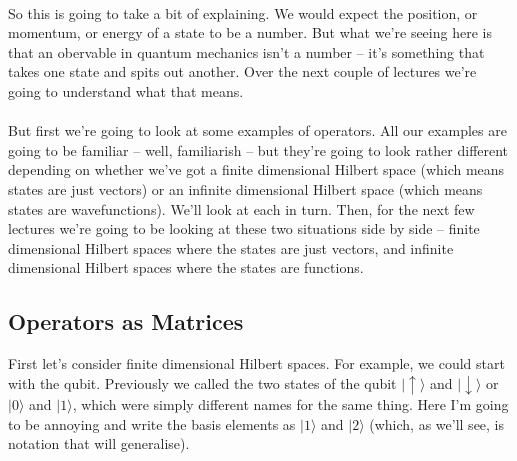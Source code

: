 \documentclass[12pt]{article}
\newcommand\para{\paragraph{}}
\newcommand{\ket}[1]{|#1\rangle}
\begin{document}
{\para
So this is going to take a bit of explaining. We would expect the position, or momentum, or energy of a state to be a number. But what we're seeing here is that an obervable in quantum mechanics isn't a number -- it's something that takes one state and spits out another. Over the next couple of lectures we're going to understand what that means. 


\para
But first we're going to look at some examples of operators. All our examples are going to be familiar -- well, familiarish -- but they're going to look rather different depending on whether we've got a finite dimensional Hilbert space (which means states are just vectors) or an infinite dimensional Hilbert space (which means states are wavefunctions). We'll look at each in turn. Then, for the next few lectures we're going to be looking at these two situations side by side -- finite dimensional Hilbert spaces where the states are just vectors, and infinite dimensional Hilbert spaces where the states are functions. 







\subsection{Operators as Matrices}

First let's consider finite dimensional Hilbert spaces. For example, we could start with the qubit. Previously we called the two states of the qubit $\ket{\uparrow}$ and $\ket{\downarrow}$ or $\ket{0}$ and $\ket{1}$, which were simply different names for the same thing. Here I'm going to be annoying and write the basis elements as $\ket{1}$ and $\ket{2}$ (which, as we'll see, is notation that will generalise). 

}
\end{document}
